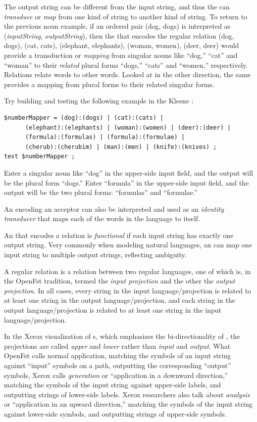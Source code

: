 The output string can be different from the input string, and thus
the \fst{} can \emph{transduce} or \emph{map} from one kind of string to another kind of string.  To return to the
previous noun example, if an ordered pair (dog, dogs) is interpreted as (\emph{inputString},
\emph{outputString}),
then the \fst{} that encodes the regular relation { (dog, dogs), (cat, cats), (elephant,
elephants), (woman, women), (deer, deer)} would provide a transduction or \emph{mapping}
from singular nouns like ``dog,'' ``cat'' and ``woman'' to their \emph{related} plural forms ``dogs,''
``cats'' and ``women,'' respectively.  Relations relate words to other words. 
Looked at in the other direction,
the same \fst{} provides a mapping from plural forms to their
related singular forms.

Try building and testing the following example in the Kleene \gui{}:


\begin{Verbatim}
$numberMapper = (dog):(dogs) | (cat):(cats) | 
      (elephant):(elephants) | (woman):(women) | (deer):(deer) |
      (formula):(formulas) | (formula):(formulae) |
      (cherub):(cherubim) | (man):(men) | (knife):(knives) ;
test $numberMapper ;
\end{Verbatim}

\noindent
Enter a singular noun like ``dog'' in the upper-side input field, and the output
will be the plural form ``dogs.''  Enter ``formula'' in the upper-side input
field, and the output will be the two plural forms:  ``formulas'' and
``formulae.''  


An \fsm{} encoding an acceptor can also be interpreted and used as an \emph{identity transducer}
that maps each of the words in the language to itself.

An \fst{} that encodes a relation is \emph{functional} if each input string has exactly one
output string.  Very commonly when modeling natural languages, an \fst{} can map one input
string to multiple output strings, reflecting ambiguity. 

A regular relation is a relation between two regular languages, one of which is, in the
OpenFst tradition, termed the
\emph{input projection} and the other the \emph{output projection}.  In all cases, every
string in the input language/projection is related to at least one
string in the output language/projection, and each string in the output language/projection is related to at
least one string in the input language/projection.

In the Xerox
visualization of \fst{}s, which emphasizes the bi-directionality of , the projections
are called \emph{upper} and \emph{lower} rather than \emph{input} and \emph{output}.  
What OpenFst calls normal application, matching the symbols
of an input string against ``input'' symbols on a path, outputting the corresponding
``output'' symbols, Xerox calls \emph{generation} or ``application in a downward
direction,'' matching the symbols of the input string against upper-side labels, and
outputting strings of lower-side labels.  Xerox
researchers also talk about \emph{analysis} or ``application in an upward direction,'' matching the symbols of
the input string against lower-side symbols, and outputting strings of upper-side symbols.  

